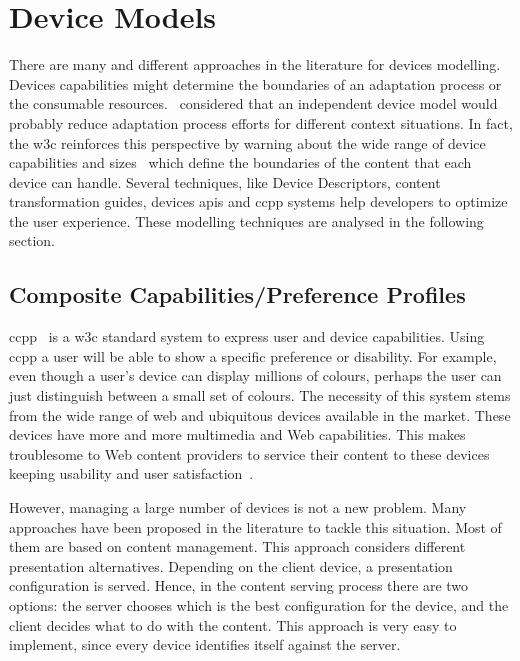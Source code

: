 
\section{Device Models}
\label{sec:devices}

There are many and different approaches in the literature for devices modelling.
Devices capabilities might determine the boundaries of an adaptation process or
the consumable resources.~\citet{lemlouma_context_aware_2004} considered that
an independent device model would probably reduce adaptation process efforts for
different context situations. In fact, the \ac{w3c} reinforces this perspective
by warning about the wide range of device capabilities and 
sizes~\citep{device_independence} which define the boundaries of the content
that each device can handle. Several techniques, like Device Descriptors, content
transformation guides, devices \acp{api} and \ac{ccpp} systems help developers 
to optimize the user experience. These modelling techniques are analysed in the 
following section. 

\subsection{Composite Capabilities/Preference Profiles}
\label{sec:ccpp}
\ac{ccpp}~\citep{ccpp_status} is a \ac{w3c} standard system to express user and 
device capabilities. Using \ac{ccpp} a user will be able to show a specific 
preference or disability. For example, even though a user's device can display 
millions of colours, perhaps the user can just distinguish between a small set 
of colours. The necessity of this system stems from the wide range of web and 
ubiquitous devices available in the market. These devices have more and more 
multimedia and Web capabilities. This makes troublesome to Web content providers 
to service their content to these devices keeping usability and user 
satisfaction~\citep{lemlouma_context_aware_2004}. 

However, managing a large number of devices is not a new problem. Many approaches 
have been proposed in the literature to tackle this situation. Most of them are 
based on content management. This approach considers different presentation 
alternatives. Depending on the client device, a presentation configuration is 
served. Hence, in the content serving process there are two options: the 
server chooses which is the best configuration for the device, and the client 
decides what to do with the content. This approach is very easy to implement, 
since every device identifies itself against the server.

